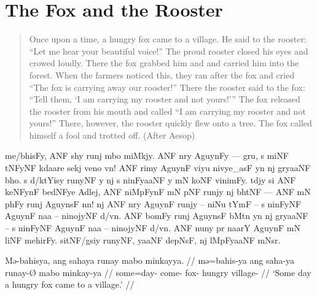 \section{The Fox and the Rooster}
\label{sec:foxrooster}

\citep[Adapted from][]{becker:uebersetzungsaufgabe}\medskip

\blockquote{Once upon a time, a hungry fox came to a village. He said to the
rooster: \enquote{Let me hear your beautiful voice!} The proud rooster closed
his eyes and crowed loudly. There the fox grabbed him and and carried him into
the forest. When the farmers noticed this, they ran after the fox and cried
\enquote{The fox is carrying away our rooster!} There the rooster said to the
fox: \enquote{Tell them, \enquote{I am carrying my rooster and not yours!}} The
fox released the rooster from his mouth and called \enquote{I am carrying my
rooster and not yours!} There, however, the rooster quickly flew onto a tree.
The fox called himself a fool and trotted off. (After Aesop)}

\begin{flushleft}
\Tagati me/bhisFy, ANF shy runj mbo miMkjy. ANF nry AguynFy — gru, s
miNF tNFyNF kdaare sekj veno vn! ANF rimy AguynF viyu nivye\_asF yn nj gryaaNF
bho. s d/ktYisy runyNF y nj s ninFyaaNF y mN koNF vinimFy. tdjy si ANF keNFynF
bedNFye Adlej, ANF niMpFynF mN pNF runjy nj bhtNF — ANF mN phFy runj AguynsF
nn! nj ANF nry AguynF runjy – niNu tYmF – s ninFyNF AguynF naa – ninojyNF
d/vn. ANF bomFy runj AguynsF bMtn yn nj gryaaNF – s ninFyNF AguynF naa –
ninojyNF d/vn. ANF nuny pr naarY AguynF mN liNF mehirFy. sitNF/gsiy runyNF,
yaaNF depNsF, nj lMpFyaaNF mNsr.
\end{flushleft}

\medskip

\pex %
\a\begingl
	\gla Mə-bahisya, ang sahaya runay mabo minkayya. //
	\glb mə=bahis-ya ang saha-ya runay-Ø mabo minkay-ya //
	\glc some=day-\Loc{} \AgtT{} come-\TsgM{} fox-\Top{} hungry
		village-\Loc{} //
	\glft `Some day a hungry fox came to a village.' //
\endgl

